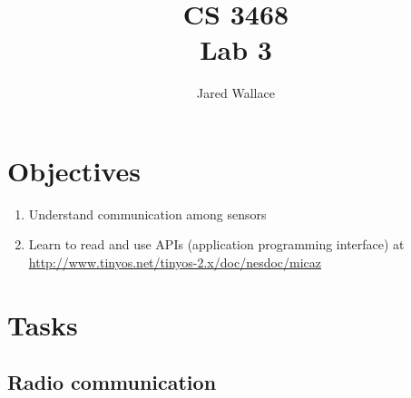 \documentclass[letterpaper,12pt]{article}
\title{\Large CS 3468\\Lab 3}
\author{Jared Wallace}
\date{}
\begin{document}
\maketitle

\vspace{30mm}

\section*{Objectives}
\begin{enumerate}
\item Understand communication among sensors
\item Learn to read and use APIs (application programming interface) at
      \url{http://www.tinyos.net/tinyos-2.x/doc/nesdoc/micaz}
\end{enumerate}

\section*{Tasks}
\subsection*{Radio communication}
\end{document}
